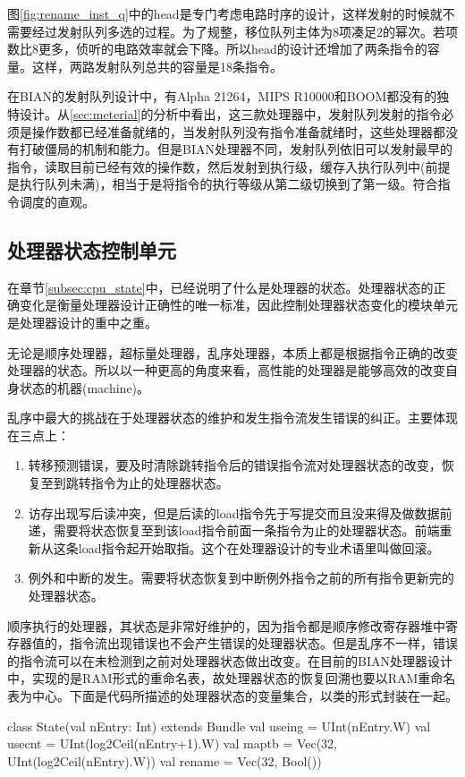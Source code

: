 图\ref{fig:rename_inst_q}中的head是专门考虑电路时序的设计，这样发射的时候就不需要经过发射队列多选的过程。为了规整，移位队列主体为8项凑足2的幂次。若项数比8更多，侦听的电路效率就会下降。所以head的设计还增加了两条指令的容量。这样，两路发射队列总共的容量是18条指令。

在BIAN的发射队列设计中，有Alpha 21264，MIPS R10000和BOOM都没有的独特设计。从\ref{sec:meterial}的分析中看出，这三款处理器中，发射队列发射的指令必须是操作数都已经准备就绪的，当发射队列没有指令准备就绪时，这些处理器都没有打破僵局的机制和能力。但是BIAN处理器不同，发射队列依旧可以发射最早的指令，读取目前已经有效的操作数，然后发射到执行级，缓存入执行队列中(前提是执行队列未满)，相当于是将指令的执行等级从第二级切换到了第一级。符合指令调度的直观。

\subsection{处理器状态控制单元}\label{subsec:state_unit}
在章节\ref{subsec:cpu_state}中，已经说明了什么是处理器的状态。处理器状态的正确变化是衡量处理器设计正确性的唯一标准，因此控制处理器状态变化的模块单元是处理器设计的重中之重。

无论是顺序处理器，超标量处理器，乱序处理器，本质上都是根据指令正确的改变处理器的状态。所以以一种更高的角度来看，高性能的处理器是能够高效的改变自身状态的机器(machine)。

乱序中最大的挑战在于处理器状态的维护和发生指令流发生错误的纠正。主要体现在三点上：
\begin{enumerate}[label=(\alph*)]
	\item 转移预测错误，要及时清除跳转指令后的错误指令流对处理器状态的改变，恢复至到跳转指令为止的处理器状态。
	\item 访存出现写后读冲突，但是后读的load指令先于写提交而且没来得及做数据前递，需要将状态恢复至到该load指令前面一条指令为止的处理器状态。前端重新从这条load指令起开始取指。这个在处理器设计的专业术语里叫做回滚。
	\item 例外和中断的发生。需要将状态恢复到中断例外指令之前的所有指令更新完的处理器状态。
\end{enumerate}

顺序执行的处理器，其状态是非常好维护的，因为指令都是顺序修改寄存器堆中寄存器值的，指令流出现错误也不会产生错误的处理器状态。但是乱序不一样，错误的指令流可以在未检测到之前对处理器状态做出改变。在目前的BIAN处理器设计中，实现的是RAM形式的重命名表，故处理器状态的恢复回溯也要以RAM重命名表为中心。下面是代码所描述的处理器状态的变量集合，以类的形式封装在一起。
\begin{scala}
	class State(val nEntry: Int) extends Bundle {
		val useing = UInt(nEntry.W)
		val usecnt = UInt(log2Ceil(nEntry+1).W)
		val maptb  = Vec(32, UInt(log2Ceil(nEntry).W))
		val rename = Vec(32, Bool())
	}
\end{scala}
	
